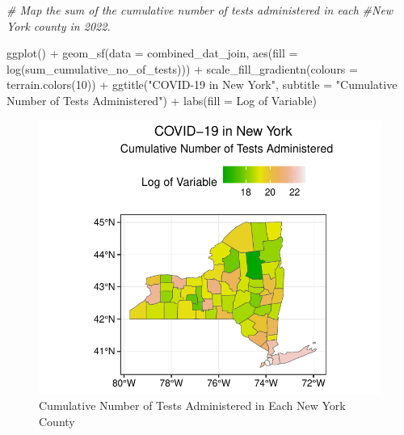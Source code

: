 \documentclass[
  12pt,
]{article}
\newenvironment{Shaded}{\begin{snugshade}}{\end{snugshade}}
\newcommand{\AttributeTok}[1]{\textcolor[rgb]{0.77,0.63,0.00}{#1}}
\newcommand{\CommentTok}[1]{\textcolor[rgb]{0.56,0.35,0.01}{\textit{#1}}}
\newcommand{\DecValTok}[1]{\textcolor[rgb]{0.00,0.00,0.81}{#1}}
\newcommand{\FunctionTok}[1]{\textcolor[rgb]{0.00,0.00,0.00}{#1}}
\newcommand{\NormalTok}[1]{#1}
\newcommand{\SpecialCharTok}[1]{\textcolor[rgb]{0.00,0.00,0.00}{#1}}
\newcommand{\StringTok}[1]{\textcolor[rgb]{0.31,0.60,0.02}{#1}}
\begin{document}
\begin{Shaded}
\begin{Highlighting}[]
\CommentTok{\# Map the sum of the cumulative number of tests administered in each}
\CommentTok{\#New York county in 2022.}

\FunctionTok{ggplot}\NormalTok{() }\SpecialCharTok{+}
  \FunctionTok{geom\_sf}\NormalTok{(}\AttributeTok{data =}\NormalTok{ combined\_dat\_join,}
          \FunctionTok{aes}\NormalTok{(}\AttributeTok{fill =} \FunctionTok{log}\NormalTok{(sum\_cumulative\_no\_of\_tests))) }\SpecialCharTok{+}
  \FunctionTok{scale\_fill\_gradientn}\NormalTok{(}\AttributeTok{colours =} \FunctionTok{terrain.colors}\NormalTok{(}\DecValTok{10}\NormalTok{)) }\SpecialCharTok{+}
  \FunctionTok{ggtitle}\NormalTok{(}\StringTok{"COVID{-}19 in New York"}\NormalTok{,}
          \AttributeTok{subtitle =} \StringTok{"Cumulative Number of Tests Administered"}\NormalTok{) }\SpecialCharTok{+}
  \FunctionTok{labs}\NormalTok{(}\AttributeTok{fill =} \StringTok{\textquotesingle{}Log of Variable\textquotesingle{}}\NormalTok{)}
\end{Highlighting}
\end{Shaded}

\begin{figure}

{\centering \includegraphics{EDA_Final_Group_Project_files/figure-latex/unnamed-chunk-17-1} 

}

\caption{Cumulative Number of Tests Administered in Each New York County}\label{fig:unnamed-chunk-17}
\end{figure}
\end{document}
